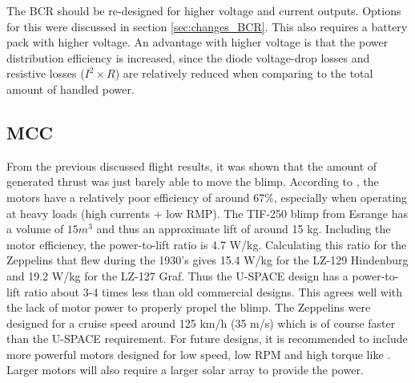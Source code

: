 The \ac{BCR} should be re-designed for higher voltage and current outputs. Options for this were discussed in section \ref{sec:changes_BCR}. This also requires a battery pack with higher voltage. An advantage with higher voltage is that the power distribution efficiency is increased, since the diode voltage-drop losses and resistive losses ($I^2 \times R$) are relatively reduced when comparing to the total amount of handled power. 
%
\subsection{MCC}
From the previous discussed flight results, it was shown that the amount of generated thrust was just barely able to move the blimp. According to \cite{website:ModelMotors}, the motors have a relatively poor efficiency of around 67\%, especially when operating at heavy loads (high currents + low \ac{RMP}). The TIF-250 blimp from Esrange has a volume of $15 m^3$ and thus an approximate lift of around 15 kg. Including the motor efficiency, the power-to-lift ratio is 4.7 W/kg. Calculating this ratio for the Zeppelins that flew during the 1930's\cite{website:graf_zeppelin} gives 15.4 W/kg for the LZ-129 Hindenburg and 19.2 W/kg for the LZ-127 Graf. Thus the U-SPACE design has a power-to-lift ratio about 3-4 times less than old commercial designs. This agrees well with the lack of motor power to properly propel the blimp. The Zeppelins were designed for a cruise speed around 125 km/h (35 m/s) which is of course faster than the U-SPACE requirement. For future designs, it is recommended to include more powerful motors designed for low speed, low \ac{RPM} and high torque like \cite{website:ModelMotors_AXI5360}. Larger motors will also require a larger solar array to provide the power.
